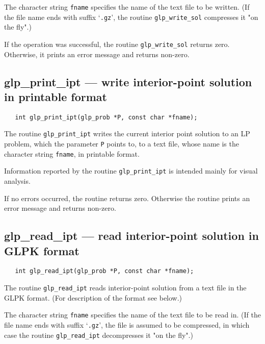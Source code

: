 The character string \verb|fname| specifies the name of the text file
to be written. (If the file name ends with suffix `\verb|.gz|', the
routine \verb|glp_write_sol| compresses it "on the fly".)

\returns

If the operation was successful, the routine \verb|glp_write_sol|
returns zero. Otherwise, it prints an error message and returns
non-zero.

\subsection{glp\_print\_ipt --- write interior-point solution in
printable format}

\synopsis

\begin{verbatim}
   int glp_print_ipt(glp_prob *P, const char *fname);
\end{verbatim}

\description

The routine \verb|glp_print_ipt| writes the current interior point
solution to an LP problem, which the parameter \verb|P| points to, to
a text file, whose name is the character string \verb|fname|, in
printable format.

Information reported by the routine \verb|glp_print_ipt| is intended
mainly for visual analysis.

\returns

If no errors occurred, the routine returns zero. Otherwise the routine
prints an error message and returns non-zero.

\subsection{glp\_read\_ipt --- read interior-point solution in GLPK
format}

\synopsis

\begin{verbatim}
   int glp_read_ipt(glp_prob *P, const char *fname);
\end{verbatim}

\description

The routine \verb|glp_read_ipt| reads interior-point solution from
a text file in the GLPK format. (For description of the format see
below.)

The character string \verb|fname| specifies the name of the text file
to be read in. (If the file name ends with suffix `\verb|.gz|', the
file is assumed to be compressed, in which case the routine
\verb|glp_read_ipt| decompresses it "on the fly".)

